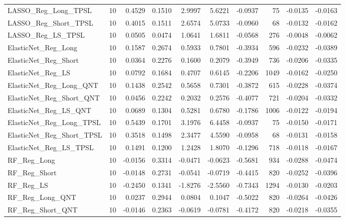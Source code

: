 \begin{tabular}{llrrrrrrrr}
\cline{1-10}
LASSO\_Reg\_Long\_TPSL & 10 & 0.4529 & 0.1510 & 2.9997 & 5.6221 & -0.0937 & 75 & -0.0135 & -0.0163 \\
\cline{1-10}
LASSO\_Reg\_Short\_TPSL & 10 & 0.4015 & 0.1511 & 2.6574 & 5.0733 & -0.0960 & 68 & -0.0132 & -0.0162 \\
\cline{1-10}
LASSO\_Reg\_LS\_TPSL & 10 & 0.0505 & 0.0474 & 1.0641 & 1.6811 & -0.0568 & 276 & -0.0048 & -0.0062 \\
\cline{1-10}
ElasticNet\_Reg\_Long & 10 & 0.1587 & 0.2674 & 0.5933 & 0.7801 & -0.3934 & 596 & -0.0232 & -0.0389 \\
\cline{1-10}
ElasticNet\_Reg\_Short & 10 & 0.0364 & 0.2276 & 0.1600 & 0.2079 & -0.3949 & 736 & -0.0206 & -0.0335 \\
\cline{1-10}
ElasticNet\_Reg\_LS & 10 & 0.0792 & 0.1684 & 0.4707 & 0.6145 & -0.2206 & 1049 & -0.0162 & -0.0250 \\
\cline{1-10}
ElasticNet\_Reg\_Long\_QNT & 10 & 0.1438 & 0.2542 & 0.5658 & 0.7301 & -0.3872 & 615 & -0.0228 & -0.0374 \\
\cline{1-10}
ElasticNet\_Reg\_Short\_QNT & 10 & 0.0456 & 0.2242 & 0.2032 & 0.2576 & -0.4077 & 721 & -0.0204 & -0.0332 \\
\cline{1-10}
ElasticNet\_Reg\_LS\_QNT & 10 & 0.0689 & 0.1304 & 0.5281 & 0.6780 & -0.1786 & 1006 & -0.0122 & -0.0194 \\
\cline{1-10}
ElasticNet\_Reg\_Long\_TPSL & 10 & 0.5439 & 0.1701 & 3.1976 & 6.4458 & -0.0937 & 75 & -0.0150 & -0.0171 \\
\cline{1-10}
ElasticNet\_Reg\_Short\_TPSL & 10 & 0.3518 & 0.1498 & 2.3477 & 4.5590 & -0.0958 & 68 & -0.0131 & -0.0158 \\
\cline{1-10}
ElasticNet\_Reg\_LS\_TPSL & 10 & 0.1491 & 0.1200 & 1.2428 & 1.8070 & -0.1296 & 718 & -0.0118 & -0.0167 \\
\cline{1-10}
RF\_Reg\_Long & 10 & -0.0156 & 0.3314 & -0.0471 & -0.0623 & -0.5681 & 934 & -0.0288 & -0.0474 \\
\cline{1-10}
RF\_Reg\_Short & 10 & -0.0148 & 0.2731 & -0.0541 & -0.0719 & -0.4415 & 820 & -0.0252 & -0.0396 \\
\cline{1-10}
RF\_Reg\_LS & 10 & -0.2450 & 0.1341 & -1.8276 & -2.5560 & -0.7343 & 1294 & -0.0130 & -0.0203 \\
\cline{1-10}
RF\_Reg\_Long\_QNT & 10 & 0.0237 & 0.2944 & 0.0804 & 0.1047 & -0.5022 & 820 & -0.0264 & -0.0426 \\
\cline{1-10}
RF\_Reg\_Short\_QNT & 10 & -0.0146 & 0.2363 & -0.0619 & -0.0781 & -0.4172 & 820 & -0.0218 & -0.0355 \\

\end{tabular}
